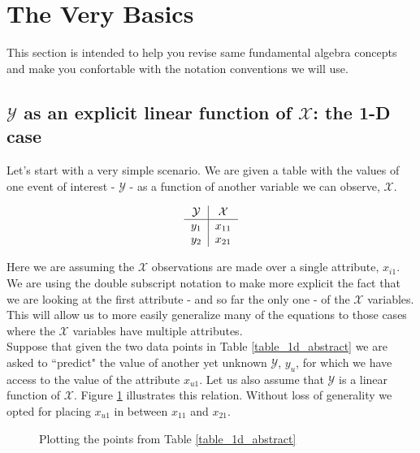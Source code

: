 \section{The Very Basics}
This section is intended to help you revise same fundamental algebra concepts and make you confortable with the notation conventions we will use. 


\subsection{$\mathcal{Y}$ as an explicit linear function of $\mathcal{X}$: the 1-D case}

Let's start with a very simple scenario. We are given a table with the values of one event of interest - $\mathcal{Y}$ - as a function of another variable we can observe, $\mathcal{X}$. 

\begin{align}
\begin{tabular}{c|c}
$\mathcal{Y}$ & $\mathcal{X}$ \\
\hline
$y_1$ & $x_{11}$\\
$y_2$ & $x_{21}$\\
\end{tabular}
\label{table_1d_abstract}
\end{align}

Here we are assuming the $\mathcal{X}$ observations are made over a single attribute, $x_{i1}$. We are using the double subscript notation to make more explicit the fact that we are looking at the first attribute - and so far the only one - of the $\mathcal{X}$ variables. This will allow us to more easily generalize many of the equations to those cases where the $\mathcal{X}$ variables have multiple attributes.\\

Suppose that given the two data points in Table \ref{table_1d_abstract} we are asked to ``predict" the value of another yet unknown $\mathcal{Y}$, $y_u$, for which we have access to the value of the attribute $x_{u1}$. Let us also assume that $\mathcal{Y}$ is a linear function of $\mathcal{X}$. Figure \ref{fig.simple_line} illustrates this relation. Without loss of generality we opted for placing $x_{u1}$ in between $x_{11}$ and $x_{21}$.\\

\begin {figure}[H]
\begin{center}
  
\end{center}
\caption{Plotting the points from Table \ref{table_1d_abstract}}
\label{fig.simple_line}
\end {figure}

